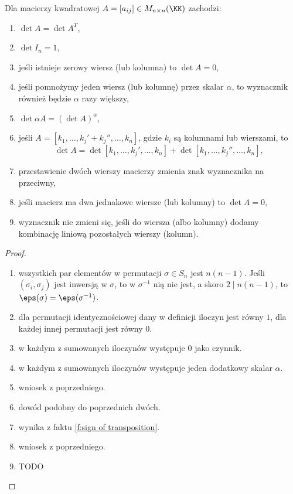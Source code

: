 \begin{theorem}
    \label{t:determinant properties}
    Dla macierzy kwadratowej $A = [a_{ij}] \in M_{n\times n}(\KK)$ zachodzi:
    \begin{enumerate}
        \item $\det A = \det A^T$,
        \item $\det I_n = 1$,
        \item jeśli istnieje zerowy wiersz (lub kolumna) to $\det A = 0$,
        \item jeśli pomnożymy jeden wiersz (lub kolumnę) przez skalar $\alpha$, to wyznacznik również będzie $\alpha$ razy większy,
        \item $\det \alpha A = (\det A) ^ \alpha$,
        \item jeśli $A = [k_1, \ldots, k_j' + k_j'', \ldots, k_n]$, gdzie $k_i$ są kolumnami lub wierszami, to
              \[ \det A = \det [k_1, \ldots, k_j', \ldots, k_n] + \det [k_1, \ldots, k_j'', \ldots, k_n], \]
        \item przestawienie dwóch wierszy macierzy zmienia znak wyznacznika na przeciwny,
        \item jeśli macierz ma dwa jednakowe wiersze (lub kolumny) to $\det A = 0$,
        \item wyznacznik nie zmieni się, jeśli do wiersza (albo kolumny) dodamy kombinację liniową pozostałych wierszy (kolumn).
    \end{enumerate}
\end{theorem}
\begin{proof}
    \begin{enumerate}
        \item wszystkich par elementów w permutacji $\sigma \in S_n$ jest $n(n-1)$. Jeśli $(\sigma_i, \sigma_j)$ jest inwersją w $\sigma$, to w $\sigma^{-1}$ nią nie jest, a skoro $2\mid n(n-1)$, to $\eps(\sigma) = \eps(\sigma^{-1})$.
        \item dla permutacji identycznościowej dany w definicji iloczyn jest równy $1$, dla każdej innej permutacji jest równy $0$.
        \item w każdym z sumowanych iloczynów występuje $0$ jako czynnik.
        \item w każdym z sumowanych iloczynów występuje jeden dodatkowy skalar $\alpha$.
        \item wniosek z poprzedniego.
        \item dowód podobny do poprzednich dwóch.
        \item wynika z faktu \ref{f:sign of transposition}.
        \item wniosek z poprzedniego.
        \item TODO
    \end{enumerate}
\end{proof}

